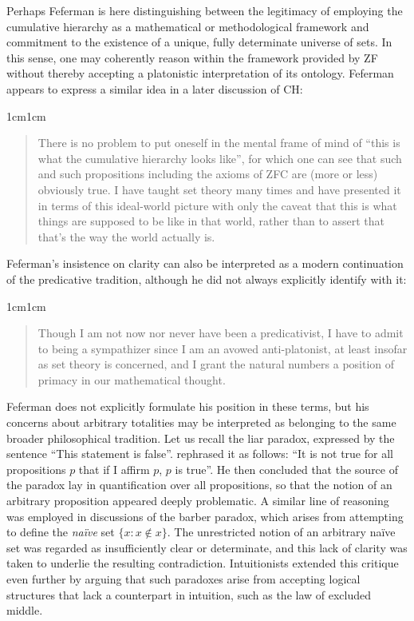 \documentclass[11pt,a4paper]{book}
\theoremstyle{plain}
\begin{document}
Perhaps Feferman is here distinguishing between the legitimacy of employing the cumulative hierarchy as a mathematical or methodological framework and commitment to the existence of a unique, fully determinate universe of sets. In this sense, one may coherently reason within the framework provided by ZF without thereby accepting a platonistic interpretation of its ontology. Feferman appears to express a similar idea in a later discussion of CH:

\begin{adjustwidth}{1cm}{1cm}
\begin{quote}
\small
There is no problem to put oneself in the mental frame of mind of “this is what the cumulative hierarchy looks like”, for which one can see that such and such propositions including the axioms of ZFC are (more or less) obviously true. I have taught set theory many times and have presented it in terms of this ideal-world picture with only the caveat that this is what things are supposed to be like in that world, rather than to assert that that's the way the world actually is. \textcite[19]{Feferman2011a}
\end{quote}
\end{adjustwidth}

Feferman's insistence on clarity can also be interpreted as a modern continuation of the predicative tradition, although he did not always explicitly identify with it:

\begin{adjustwidth}{1cm}{1cm}
\begin{quote}
\small
Though I am not now nor never have been a predicativist, I have to admit to being a sympathizer since I am an avowed anti-platonist, at least insofar as set theory is concerned, and I grant the natural numbers a position of primacy in our mathematical thought. \textcite[313]{Feferman2004a}
\end{quote}
\end{adjustwidth}

Feferman does not explicitly formulate his position in these terms, but his concerns about arbitrary totalities may be interpreted as belonging to the same broader philosophical tradition. Let us recall the liar paradox, expressed by the sentence ``This statement is false''. \textcite[224]{Russell1908} rephrased it as follows: ``It is not true for all propositions $p$ that if I affirm $p$, $p$ is true''. He then concluded that the source of the paradox lay in quantification over all propositions, so that the notion of an arbitrary proposition appeared deeply problematic. A similar line of reasoning was employed in discussions of the barber paradox, which arises from attempting to define the \emph{naïve} set $\{x : x \notin x\}$. The unrestricted notion of an arbitrary naïve set was regarded as insufficiently clear or determinate, and this lack of clarity was taken to underlie the resulting contradiction. Intuitionists extended this critique even further by arguing that such paradoxes arise from accepting logical structures that lack a counterpart in intuition, such as the law of excluded middle.
\end{document}
